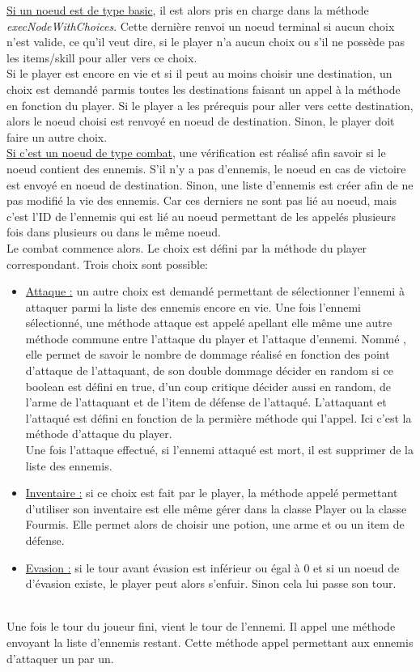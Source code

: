 		\underline{Si un noeud est de type basic}, il est alors pris en charge dans la méthode \textit{execNodeWithChoices}. Cette dernière renvoi un noeud terminal si aucun choix n'est valide, ce qu'il veut dire, si le player n'a aucun choix ou s'il ne possède pas les items/skill pour aller vers ce choix.\\
		Si le player est encore en vie et si il peut au moins choisir une destination, un choix est demandé parmis toutes les destinations faisant un appel à la méthode en fonction du player. Si le player a les prérequis pour aller vers cette destination, alors le noeud choisi est renvoyé en noeud de destination. Sinon, le player doit faire un autre choix.\\

		\underline{Si c'est un noeud de type combat}, une vérification est réalisé afin savoir si le noeud contient des ennemis. S'il n'y a pas d'ennemis, le noeud en cas de victoire est envoyé en noeud de destination. Sinon, une liste d'ennemis est créer afin de ne pas modifié la vie des ennemis. Car ces derniers ne sont pas lié au noeud, mais c'est l'ID de l'ennemis qui est lié au noeud permettant de les appelés plusieurs fois dans plusieurs ou dans le même noeud.\\
		Le combat commence alors. Le choix est défini par la méthode du player correspondant. Trois choix sont possible:\\
		\begin{itemize}
			\item \underline{Attaque :} un autre choix est demandé permettant de sélectionner l'ennemi à attaquer parmi la liste des ennemis encore en vie. Une fois l'ennemi sélectionné, une méthode attaque est appelé apellant elle même une autre méthode commune entre l'attaque du player et l'attaque d'ennemi. Nommé , elle permet de savoir le nombre de dommage réalisé en fonction des point d'attaque de l'attaquant, de son double dommage décider en random si ce boolean est défini en true, d'un coup critique décider aussi en random, de l'arme de l'attaquant et de l'item de défense de l'attaqué. L'attaquant et l'attaqué est défini en fonction de la permière méthode qui l'appel. Ici c'est la méthode d'attaque du player.\\
			Une fois l'attaque effectué, si l'ennemi attaqué est mort, il est supprimer de la liste des ennemis.
			\item \underline{Inventaire :} si ce choix est fait par le player, la méthode appelé permettant d'utiliser son inventaire est elle même gérer dans la classe Player ou la classe Fourmis. Elle permet alors de choisir une potion, une arme et ou un item de défense.
			\item \underline{Evasion :} si le tour avant évasion est inférieur ou égal à 0 et si un noeud de d'évasion existe, le player peut alors s'enfuir. Sinon cela lui passe son tour.
		\end{itemize}
		\\
		Une fois le tour du joueur fini, vient le tour de l'ennemi. Il appel une méthode envoyant la liste d'ennemis restant. Cette méthode appel  permettant aux ennemis d'attaquer un par un.\\

